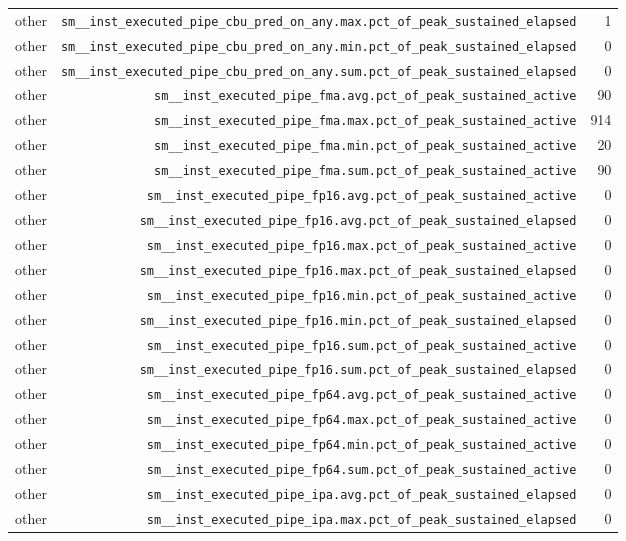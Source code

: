 \begin{table}[h]
\begin{tabular}{|l|r|r|}
other & \texttt{sm__inst_executed_pipe_cbu_pred_on_any.max.pct_of_peak_sustained_elapsed} & 1 \\
other & \texttt{sm__inst_executed_pipe_cbu_pred_on_any.min.pct_of_peak_sustained_elapsed} & 0 \\
other & \texttt{sm__inst_executed_pipe_cbu_pred_on_any.sum.pct_of_peak_sustained_elapsed} & 0 \\
other & \texttt{sm__inst_executed_pipe_fma.avg.pct_of_peak_sustained_active} & 90 \\
other & \texttt{sm__inst_executed_pipe_fma.max.pct_of_peak_sustained_active} & 914 \\
other & \texttt{sm__inst_executed_pipe_fma.min.pct_of_peak_sustained_active} & 20 \\
other & \texttt{sm__inst_executed_pipe_fma.sum.pct_of_peak_sustained_active} & 90 \\
other & \texttt{sm__inst_executed_pipe_fp16.avg.pct_of_peak_sustained_active} & 0 \\
other & \texttt{sm__inst_executed_pipe_fp16.avg.pct_of_peak_sustained_elapsed} & 0 \\
other & \texttt{sm__inst_executed_pipe_fp16.max.pct_of_peak_sustained_active} & 0 \\
other & \texttt{sm__inst_executed_pipe_fp16.max.pct_of_peak_sustained_elapsed} & 0 \\
other & \texttt{sm__inst_executed_pipe_fp16.min.pct_of_peak_sustained_active} & 0 \\
other & \texttt{sm__inst_executed_pipe_fp16.min.pct_of_peak_sustained_elapsed} & 0 \\
other & \texttt{sm__inst_executed_pipe_fp16.sum.pct_of_peak_sustained_active} & 0 \\
other & \texttt{sm__inst_executed_pipe_fp16.sum.pct_of_peak_sustained_elapsed} & 0 \\
other & \texttt{sm__inst_executed_pipe_fp64.avg.pct_of_peak_sustained_active} & 0 \\
other & \texttt{sm__inst_executed_pipe_fp64.max.pct_of_peak_sustained_active} & 0 \\
other & \texttt{sm__inst_executed_pipe_fp64.min.pct_of_peak_sustained_active} & 0 \\
other & \texttt{sm__inst_executed_pipe_fp64.sum.pct_of_peak_sustained_active} & 0 \\
other & \texttt{sm__inst_executed_pipe_ipa.avg.pct_of_peak_sustained_elapsed} & 0 \\
other & \texttt{sm__inst_executed_pipe_ipa.max.pct_of_peak_sustained_elapsed} & 0 \\

\end{tabular}
\end{table}

